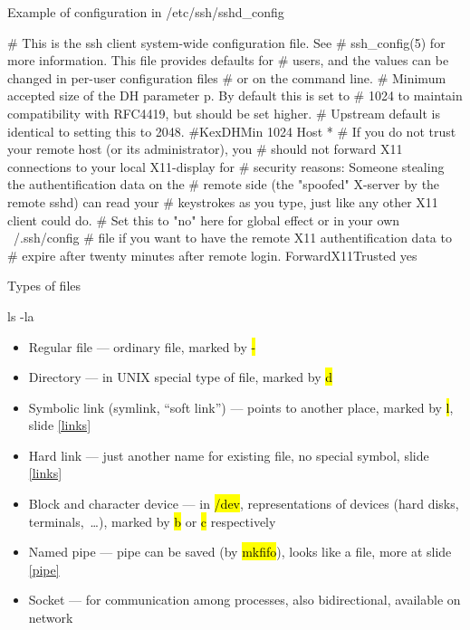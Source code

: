 \documentclass[compress, ucs, xelatex, 11pt, xcolor=svgnames,
  hyperref={
    bookmarks=true,
    unicode=true,
    colorlinks=true,
    pdftitle={Linux, command line and MetaCentrum},
    plainpages=false,
    pdfauthor={Vojtech Zeisek},
    pdfsubject={Course about use of Linux command line, writing shell scripts and using MetaCentrum of CESNET},
    pdfcreator={XeLaTeX},
    pdfkeywords={Linux, GNU, BASH, shell, command line, MetaCentrum},
    linkcolor=DarkRed,
    anchorcolor=DarkBlue,
    citecolor=Indigo,
    filecolor=NavyBlue,
    menucolor=DarkMagenta,
    urlcolor=DarkBlue,
    pdftex},
  url={hyphens, lowtilde} %
  ]{beamer}
\renewcommand{\texttt}[1]{\hl{\ttfamily #1}}
\begin{document}
\begin{frame}[fragile]{Example of configuration in /etc/ssh/sshd\_config}
  \begin{bashcode}
    # This is the ssh client system-wide configuration file.  See
    # ssh_config(5) for more information.  This file provides defaults for
    # users, and the values can be changed in per-user configuration files
    # or on the command line.
    # Minimum accepted size of the DH parameter p. By default this is set to
    # 1024 to maintain compatibility with RFC4419, but should be set higher.
    # Upstream default is identical to setting this to 2048.
    #KexDHMin 1024
    Host *
    # If you do not trust your remote host (or its administrator), you
    # should not forward X11 connections to your local X11-display for
    # security reasons: Someone stealing the authentification data on the
    # remote side (the "spoofed" X-server by the remote sshd) can read your
    # keystrokes as you type, just like any other X11 client could do.
    # Set this to "no" here for global effect or in your own ~/.ssh/config
    # file if you want to have the remote X11 authentification data to
    # expire after twenty minutes after remote login.
	ForwardX11Trusted yes
  \end{bashcode}
\end{frame}

\begin{frame}[fragile]{Types of files}
  \begin{bashcode}
    ls -la ~
  \end{bashcode}
  \begin{itemize}
    \item Regular file --- ordinary file, marked by \texttt{-}
    \item Directory --- in UNIX special type of file, marked by \texttt{d}
    \item Symbolic link (symlink, ``soft link'') --- points to another place, marked by \texttt{l}, slide \ref{links}
    \item Hard link --- just another name for existing file, no special symbol, slide \ref{links}
    \item Block and character device --- in \texttt{/dev}, representations of devices (hard disks, terminals,~\ldots), marked by \texttt{b} or \texttt{c} respectively
    \item Named pipe --- pipe can be saved (by \texttt{mkfifo}), looks like a file, more at slide \ref{pipe}
    \item Socket --- for communication among processes, also bidirectional, available on network
  \end{itemize}
\end{frame}
\end{document}
